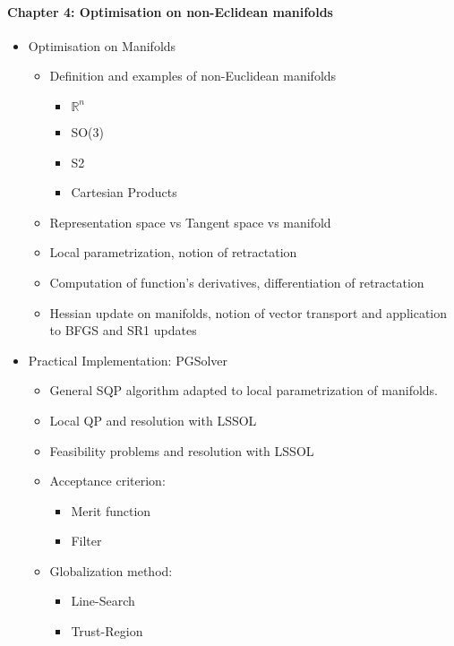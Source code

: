 \documentclass{article}
\begin{document}

\paragraph {Chapter 4: Optimisation on non-Eclidean manifolds }
\begin{itemize}
  \item{Optimisation on Manifolds}
    \begin{itemize}
      \item Definition and examples of non-Euclidean manifolds
        \begin{itemize}
          \item $\mathbb{R}^n$
          \item SO(3)
          \item S2
          \item Cartesian Products
        \end{itemize}
      \item Representation space vs Tangent space vs manifold
      \item Local parametrization, notion of retractation
      \item Computation of function's derivatives, differentiation of retractation
      \item Hessian update on manifolds, notion of vector transport and application to BFGS and SR1 updates
    \end{itemize}
  \item{Practical Implementation: PGSolver}
    \begin{itemize}
      \item General SQP algorithm adapted to local parametrization of manifolds.
      \item Local QP and resolution with LSSOL
      \item Feasibility problems and resolution with LSSOL
      \item Acceptance criterion:
        \begin{itemize}
          \item Merit function
          \item Filter
        \end{itemize}
      \item Globalization method:
        \begin{itemize}
          \item Line-Search
          \item Trust-Region
            \begin{itemize}

\end{itemize}
\end{itemize}
\end{itemize}
\end{itemize}
\end{document}
